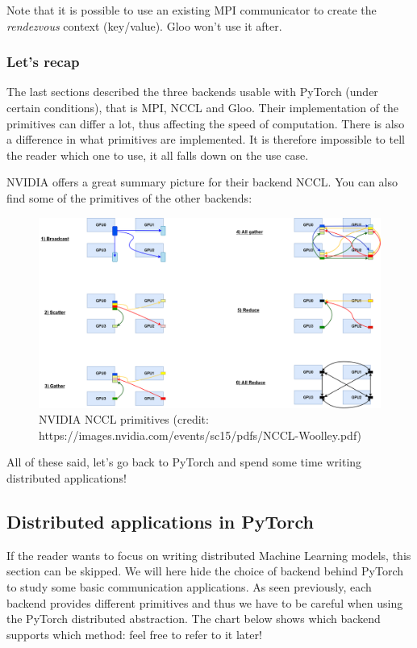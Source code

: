 \documentclass{article}
\begin{document}
Note that it is possible to use an existing MPI communicator to create the \emph{rendezvous} context (key/value). Gloo won't use it after.

\subsubsection{Let's recap}
The last sections described the three backends usable with PyTorch (under certain conditions), that is MPI, NCCL and Gloo. Their implementation of the primitives can differ a lot, thus affecting the speed of computation. There is also a difference in what primitives are implemented. It is therefore impossible to tell the reader which one to use, it all falls down on the use case.

NVIDIA offers a great summary picture for their backend NCCL. You can also find some of the primitives of the other backends:

\begin{figure}[h!]
  \center
  \includegraphics[width=0.7\linewidth]{images/2022-09-07-15-00-16.png}
  \caption{NVIDIA NCCL primitives (credit: https://images.nvidia.com/events/sc15/pdfs/NCCL-Woolley.pdf)}
\end{figure}
\FloatBarrier

All of these said, let's go back to PyTorch and spend some time writing distributed applications!

\subsection{Distributed applications in PyTorch}
If the reader wants to focus on writing distributed Machine Learning models, this section can be skipped. We will here hide the choice of backend behind PyTorch to study some basic communication applications. As seen previously, each backend provides different primitives and thus we have to be careful when using the PyTorch distributed abstraction. The chart below shows which backend supports which method: feel free to refer to it later!
\end{document}
